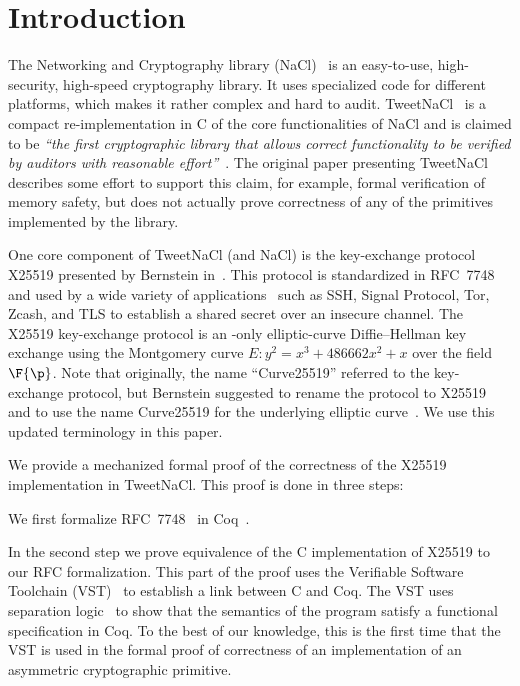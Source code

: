 \section{Introduction}
\label{sec:intro}

The Networking and Cryptography library (NaCl)~\cite{BLS12}
is an easy-to-use, high-security, high-speed cryptography library.
It uses specialized code for different platforms, which makes it rather complex and hard to audit.
TweetNaCl~\cite{BGJ+15} is a compact re-implementation in C
of the core functionalities of NaCl and is claimed to be
\emph{``the first cryptographic library that allows correct functionality
to be verified by auditors with reasonable effort''}~\cite{BGJ+15}.
The original paper presenting TweetNaCl describes some effort to support
this claim, for example, formal verification of memory safety, but does not actually
prove correctness of any of the primitives implemented by the library.

One core component of TweetNaCl (and NaCl) is the key-exchange protocol X25519 presented
by Bernstein in~\cite{rfc7748}.
This protocol is standardized in RFC~7748 and used by a wide variety of applications~\cite{things-that-use-curve25519}
such as SSH, Signal Protocol, Tor, Zcash, and TLS to establish a shared secret over
an insecure channel.
The X25519 key-exchange protocol is an \xcoord-only
elliptic-curve Diffie--Hellman key exchange using the Montgomery
curve $E: y^2 = x^3 + 486662 x^2 + x$ over the field $\F{\p}$.
Note that originally, the name ``Curve25519'' referred to the key-exchange protocol,
but Bernstein suggested to rename the protocol to X25519 and to use the name
Curve25519 for the underlying elliptic curve~\cite{Ber14}.
We use this updated terminology in this paper.

We provide a mechanized formal proof of the correctness of the X25519
implementation in TweetNaCl.
This proof is done in three steps:

We first formalize RFC~7748~\cite{rfc7748} in Coq~\cite{coq-faq}.

In the second step we prove equivalence of the C implementation of X25519
to our RFC formalization.
This part of the proof uses the Verifiable Software Toolchain (VST)~\cite{2012-Appel}
to establish a link between C and Coq.
The VST uses separation logic~\cite{1969-Hoare,Reynolds02separationlogic}
to show that the semantics of the program satisfy a functional specification in Coq.
To the best of our knowledge, this is the first time that the
VST is used in the formal proof of correctness of an implementation
of an asymmetric cryptographic primitive.

